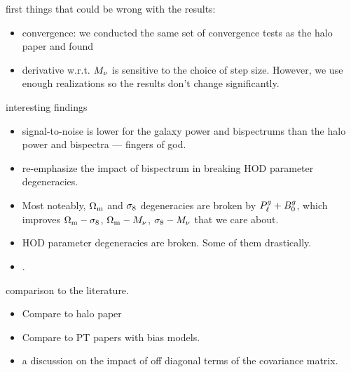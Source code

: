 first things that could be wrong with the results: 
\begin{itemize}
    \item convergence: we conducted the same set of convergence tests as the halo paper and
        found  
    \item derivative w.r.t. $M_\nu$ is sensitive to the choice of step size.
        However, we use enough realizations so the results don't change
        significantly.  
\end{itemize}

interesting findings 
\begin{itemize}
    \item signal-to-noise is lower for the galaxy power and bispectrums than
        the halo power and bispectra --- fingers of god. 
    \item re-emphasize the impact of bispectrum in breaking HOD parameter
        degeneracies. 
    \item Most noteably, $\Omega_{\rm m}$ and $\sigma_8$ degeneracies are broken by
        $P^g_{\ell} + B^g_0$, which improves $\Omega_{\rm m} - \sigma_8$, $\Omega_{\rm m} - M_\nu$,
        $\sigma_8-M_\nu$ that we care about. 
    \item HOD parameter degeneracies are broken. Some of them drastically.
    \item {}.
\end{itemize}

comparison to the literature.
\begin{itemize}
    \item Compare to halo paper 
    \item Compare to PT papers with bias models. 
    \item a discussion on the impact of off diagonal terms of the covariance matrix. 
\end{itemize} 


